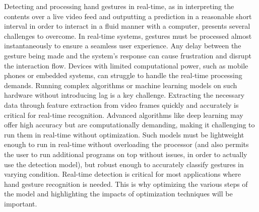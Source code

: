 \documentclass[12pt]{article}
\begin{document}
  Detecting and processing hand gestures in real-time, as in interpreting the contents over a live video feed and outputting a prediction in a reasonable short interval in order to interact in a fluid manner with a computer, presents several challenges to overcome.
  In real-time systems, gestures must be processed almost instantaneously to ensure a seamless user experience. Any delay between the gesture being made and the system’s response can cause frustration and disrupt the interaction flow. Devices with limited computational power, such as mobile phones or embedded systems, can struggle to handle the real-time processing demands. Running complex algorithms or machine learning models on such hardware without introducing lag is a key challenge.
  Extracting the necessary data through feature extraction from video frames quickly and accurately is critical for real-time recognition. Advanced algorithms like deep learning may offer high accuracy but are computationally demanding, making it challenging to run them in real-time without optimization. Such models must be lightweight enough to run in real-time without overloading the processor (and also permits the user to run additional programs on top without issues, in order to actually use the detection model), but robust enough to accurately classify gestures in varying condition.
  Real-time detection is critical for most applications where hand gesture recognition is needed. This is why optimizing the various steps of the model and highlighting the impacts of optimization techniques will be important.
\end{document}
